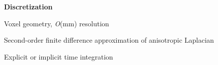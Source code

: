 \documentclass[12pt]{ICSPoster}
\begin{document}
\begin{posterbox}[2]
\begin{headerbox}[
        title=Modeling Aspects,
        width=0.47\textwidth,
        height=0.215\textheight]
\begin{minipage}{0.50\textwidth}
        \vspace{0.5cm}

        \textbf{Discretization}
        \vspace{1mm}
        \begin{compactitem}
          \item Voxel geometry, \textit{O}(mm) resolution
          \item Second-order finite difference approximation of anisotropic Laplacian
          \item Explicit or implicit time integration
        \end{compactitem}

      \end{minipage}
    \end{headerbox}
  \end{posterbox}
\end{document}
